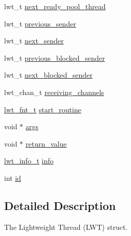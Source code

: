 \begin{DoxyCompactItemize}
\item 
lwt\+\_\+t \hyperlink{structlwt_a79a02c75963b9354392360d99cc6a468}{next\+\_\+ready\+\_\+pool\+\_\+thread}
\item 
lwt\+\_\+t \hyperlink{structlwt_ae9ef76c08e20117f01976c5c7cfb28b9}{previous\+\_\+sender}
\item 
lwt\+\_\+t \hyperlink{structlwt_a77161e9127f308ba8540546c705cc3d9}{next\+\_\+sender}
\item 
lwt\+\_\+t \hyperlink{structlwt_a2060a9eb6fe521e93c509e10e2778907}{previous\+\_\+blocked\+\_\+sender}
\item 
lwt\+\_\+t \hyperlink{structlwt_a3998a6f0e9400a8cd5534b76a9bdb843}{next\+\_\+blocked\+\_\+sender}
\item 
lwt\+\_\+chan\+\_\+t \hyperlink{structlwt_ac857ca0e804faec3a2dc17ff1ee0f22d}{receiving\+\_\+channels}
\item 
\hyperlink{lwt_8h_a58d5112b6c76cbcd033e124f6131a51a}{lwt\+\_\+fnt\+\_\+t} \hyperlink{structlwt_acdcfc344e943154b9d3d11e1a41cb9f1}{start\+\_\+routine}
\item 
void $\ast$ \hyperlink{structlwt_a6e870b21b996bc5c62b6cbd04328e784}{args}
\item 
void $\ast$ \hyperlink{structlwt_a22ac5beef8503481294035218e73c3ef}{return\+\_\+value}
\item 
\hyperlink{lwt_8h_a1148b40d53237025b24f0b603b387e75}{lwt\+\_\+info\+\_\+t} \hyperlink{structlwt_a40641e751624b983f5e1ae5302210e5d}{info}
\item 
int \hyperlink{structlwt_aa3df3d76d606756e38bb9bd3d2c2d241}{id}
\end{DoxyCompactItemize}


\subsection{Detailed Description}
The Lightweight Thread (L\+W\+T) struct. 

